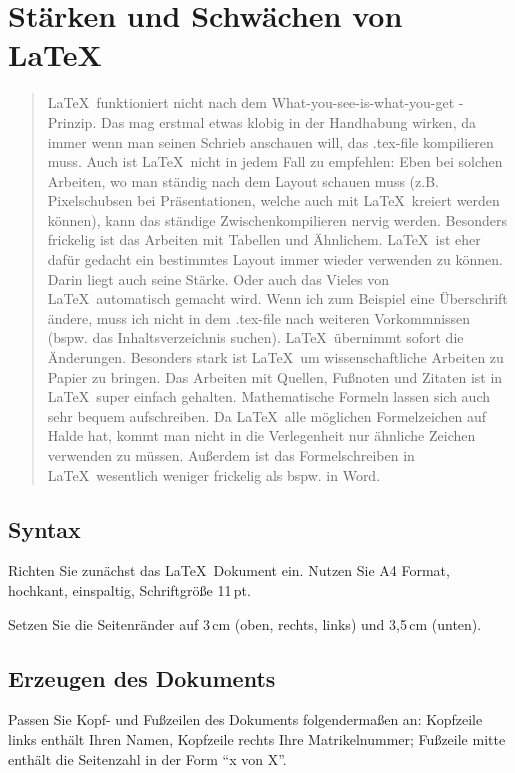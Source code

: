 \section*{Stärken und Schwächen von \LaTeX\ } 
\begin{quote}
\noindent
\LaTeX \ funktioniert nicht nach dem What-you-see-is-what-you-get - Prinzip.
Das mag erstmal etwas klobig in der Handhabung wirken, da immer wenn man seinen Schrieb anschauen will, das .tex-file
kompilieren muss.
Auch ist \LaTeX \ nicht in jedem Fall zu empfehlen: Eben bei solchen Arbeiten, wo man ständig nach dem Layout schauen muss
(z.B. Pixelschubsen bei Präsentationen, welche auch mit \LaTeX \ kreiert werden können), kann das ständige Zwischenkompilieren
nervig werden.
Besonders frickelig ist das Arbeiten mit Tabellen und Ähnlichem.
\LaTeX \ ist eher dafür gedacht ein bestimmtes Layout immer wieder verwenden zu können.
Darin liegt auch seine Stärke.
Oder auch das Vieles von \LaTeX \ automatisch gemacht wird. Wenn ich zum Beispiel eine Überschrift ändere, muss ich nicht in dem 
.tex-file nach weiteren Vorkommnissen (bspw. das Inhaltsverzeichnis suchen).
\LaTeX \ übernimmt sofort die Änderungen.
Besonders stark ist \LaTeX \ um wissenschaftliche Arbeiten zu Papier zu bringen.
Das Arbeiten mit Quellen, Fußnoten und Zitaten ist in \LaTeX \ super einfach gehalten.
Mathematische Formeln lassen sich auch sehr bequem aufschreiben.
Da \LaTeX \ alle möglichen Formelzeichen auf Halde hat, kommt man nicht in die Verlegenheit nur ähnliche Zeichen verwenden zu müssen.
Außerdem ist das Formelschreiben in \LaTeX \ wesentlich weniger frickelig als bspw. in Word.
\end{quote}
\pagebreak

\subsection{Syntax}

\begin{aufgabe}
Richten Sie zun\"achst das \LaTeX\ Dokument ein. Nutzen Sie A4 Format,
hochkant, einspaltig, Schriftgr\"o\ss e 11\,pt.
\end{aufgabe}	


\begin{aufgabe}
Setzen Sie die Seitenr\"ander auf 3\,cm (oben, rechts, links) und 3,5\,cm
(unten).
\end{aufgabe}

\subsection{Erzeugen des Dokuments}
\begin{aufgabe}
Passen Sie Kopf- und Fu\ss zeilen des Dokuments folgenderma\ss en an:
Kopfzeile links enth\"alt Ihren Namen, Kopfzeile rechts Ihre Matrikelnummer;
Fu\ss{}zeile mitte enth\"alt die Seitenzahl in der Form ``x von X''.
\end{aufgabe}



